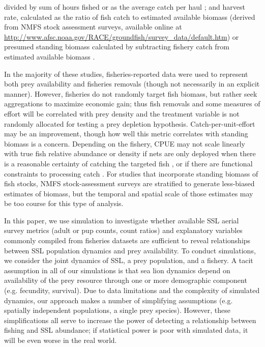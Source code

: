 \documentclass[nonumbib,leqno]{nrc1}
\begin{document}
divided by sum of hours fished \citep{Loughlin:1989kl,Hennen:2006bs,Calkins:2008ve} or as the average catch per haul \citep{Trites:2010ly}; and harvest rate, calculated as the ratio of fish catch to estimated available biomass (derived from NMFS stock assessment surveys, available online at \url{http://www.afsc.noaa.gov/RACE/groundfish/survey_data/default.htm}) or presumed standing biomass calculated by subtracting fishery catch from estimated available biomass \citep{Hui:2011uq}.

In the majority of these studies, fisheries-reported data were used to represent both prey availability and fisheries removals (though not necessarily in an explicit manner). However, fisheries do not randomly target fish biomass, but rather seek aggregations to maximize economic gain; thus fish removals and some measures of effort will be correlated with prey density and the treatment variable is not randomly allocated for testing a prey depletion hypothesis. Catch-per-unit-effort may be an improvement, though how well this metric correlates with standing biomass is a concern. Depending on the fishery, CPUE may not scale linearly with true fish relative abundance or density if nets are only deployed when there is a reasonable certainty of catching the targeted fish \citep{Hilborn1992,SalthaugAanes2003}, or if there are functional constraints to processing catch \citep{Trites:2010ly}. For studies that incorporate standing biomass of fish stocks, NMFS stock-assessment surveys are stratified to generate less-biased estimates of biomass, but the temporal and spatial scale of those estimates may be too course for this type of analysis.

In this paper, we use simulation to investigate whether available SSL aerial survey metrics (adult or pup counts, count ratios) and explanatory variables commonly compiled from fisheries datasets are sufficient to reveal relationships between SSL population dynamics and prey availability. To conduct simulations, we consider the joint dynamics of SSL, a prey population, and a fishery.  A tacit assumption in all of our simulations is that sea lion dynamics depend on availability of the prey resource through one or more demographic component (e.g. fecundity, survival).  Due to data limitations and the complexity of simulated dynamics, our approach makes a number of simplifying assumptions (e.g. spatially independent populations, a single prey species).  However, these simplifications all serve to increase the power of detecting a relationship between fishing and SSL abundance; if statistical power is poor with simulated data, it will be even worse in the real world.
\end{document}
